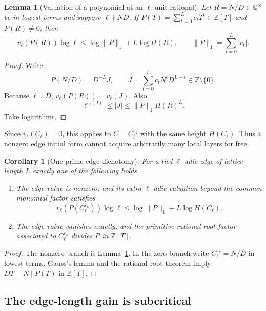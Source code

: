 \documentclass[11pt,oneside]{article}
\newtheorem{lemma}[theorem]{Lemma}
\newtheorem{corollary}[theorem]{Corollary}
\theoremstyle{definition}
\theoremstyle{remark}
\newcommand{\Z}{\mathbb Z}
\newcommand{\Q}{\mathbb Q}
\newcommand{\eps}{\varepsilon}
\begin{document}
\begin{lemma}[Valuation of a polynomial at an $\ell$-unit rational]
\label{lem:rational-eval-bound}
Let $R=N/D\in\Q^\times$ be in lowest terms and suppose $\ell\nmid ND$.  If
$P(T)=\sum_{t=0}^Lc_tT^t\in\Z[T]$ and $P(R)\ne0$, then
\begin{equation}
 v_\ell(P(R))\log\ell
 \le \log\lVert P\rVert_1+L\log H(R),
 \qquad \lVert P\rVert_1=\sum_{t=0}^L|c_t|.
 \label{eq:rational-eval-bound}
\end{equation}
\end{lemma}

\begin{proof}
Write
\[
 P(N/D)=D^{-L}J,
 \qquad
 J=\sum_{t=0}^Lc_tN^tD^{L-t}\in\Z\setminus\{0\}.
\]
Because $\ell\nmid D$, $v_\ell(P(R))=v_\ell(J)$.  Also
\[
 \ell^{v_\ell(J)}\le |J|
 \le\lVert P\rVert_1H(R)^L.
\]
Take logarithms.
\end{proof}

Since $v_\ell(C_\ell)=0$, this applies to $C=C_\ell^{\eps_k}$ with the same height
$H(C_\ell)$.  Thus a nonzero edge initial form cannot acquire arbitrarily many local layers
for free.

\begin{corollary}[One-prime edge dichotomy]
\label{cor:edge-dichotomy}
For a tied $\ell$-adic edge of lattice length $L$ exactly one of the following holds.
\begin{enumerate}
\item The edge value is nonzero, and its extra $\ell$-adic valuation beyond the common
monomial factor satisfies
\begin{equation}
 v_\ell(P(C_\ell^{\eps_k}))\log\ell
 \le \log\lVert P\rVert_1+L\log H(C_\ell).
 \label{eq:edge-extra-bound}
\end{equation}
\item The edge value vanishes exactly, and the primitive rational-root factor associated to
$C_\ell^{\eps_k}$ divides $P$ in $\Z[T]$.
\end{enumerate}
\end{corollary}

\begin{proof}
The nonzero branch is Lemma~\ref{lem:rational-eval-bound}.  In the zero branch write
$C_\ell^{\eps_k}=N/D$ in lowest terms.  Gauss's lemma and the rational-root theorem imply
$DT-N\mid P(T)$ in $\Z[T]$.
\end{proof}

\subsection{The edge-length gain is subcritical}
\end{document}
